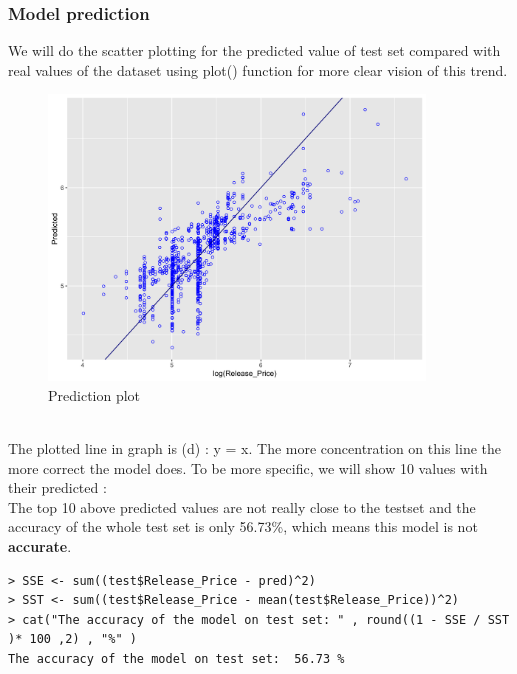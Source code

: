 \documentclass[a4paper]{article}
\theoremstyle{definition}
\begin{document}
\subsubsection{Model prediction}
We will do the scatter plotting for the predicted value of test set compared with real values of the dataset using plot() function for more clear vision of this trend.\\
\begin{figure}[h!]
\begin{center}
\includegraphics[width=10cm]{images/pre_log.png}
\end{center}
\caption{Prediction plot}
\end{figure}
\\
The plotted line in graph is (d) : y = x. The more concentration on this line the more correct the model does. To be more specific, we will show 10 values with their predicted : \\

The top 10 above predicted values are not really close to the test\textunderscore set and the accuracy of the whole test set is only 56.73\%, which means this model is not \textbf{accurate}. 
\begin{mdframed}[leftline=false,rightline=false,backgroundcolor=lightblue!10,nobreak=false,numbers=false]
    \begin{verbatim}
> SSE <- sum((test$Release_Price - pred)^2)
> SST <- sum((test$Release_Price - mean(test$Release_Price))^2)
> cat("The accuracy of the model on test set: " , round((1 - SSE / SST )* 100 ,2) , "%" )
The accuracy of the model on test set:  56.73 %
\end{verbatim}
\end{mdframed}
\pagebreak
\end{document}
